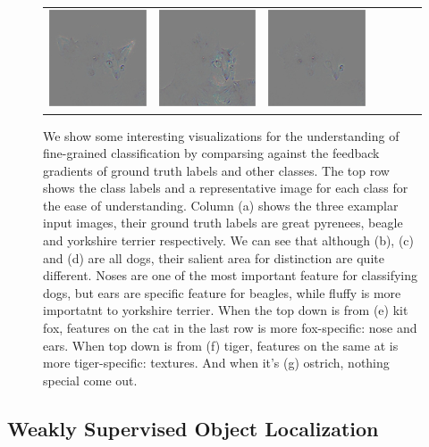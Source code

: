\begin{figure}
\begin{center}
\begin{tabular}{ccccccc}
\includegraphics[width=0.14\linewidth,height=0.115\linewidth]{figs/class_compare/googlenet/soft/dog-cat3_diff_279} &
\includegraphics[width=0.14\linewidth,height=0.115\linewidth]{figs/class_compare/googlenet/soft/dog-cat3_diff_293} &
\includegraphics[width=0.14\linewidth,height=0.115\linewidth]{figs/class_compare/googlenet/soft/dog-cat3_diff_10} \\
\end{tabular}
\caption{We show some interesting visualizations for the understanding of fine-grained classification by comparsing against the feedback gradients of ground truth labels and other classes. The top row shows the class labels and a representative image for each class for the ease of understanding. Column (a) shows the three examplar input images, their ground truth labels are great pyrenees, beagle and yorkshire terrier respectively. We can see that although (b), (c) and (d) are all dogs, their salient area for distinction are quite different. Noses are one of the most important feature for classifying dogs, but ears are specific feature for beagles, while fluffy is more importatnt to yorkshire terrier. When the top down is from (e) kit fox, features on the cat in the last row is more fox-specific: nose and ears. When top down is from (f) tiger, features on the same at is more tiger-specific: textures. And when it's (g) ostrich, nothing special come out.}
\label{fig:class_compare}
\end{center}
\end{figure}

\subsection{Weakly Supervised Object Localization}
\label{subsec:localization}

